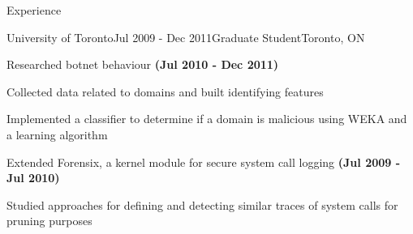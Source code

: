 \documentclass{resume}
\begin{document}
\begin{rSection}{Experience}
    \begin{rSubsection}{University of Toronto}{Jul 2009 - Dec 2011}{Graduate Student}{Toronto, ON}
      \item Researched botnet behaviour \textbf{(Jul 2010 - Dec 2011)}
      \item Collected data related to domains and built identifying features
      \item Implemented a classifier to determine if a domain is malicious using WEKA and a learning algorithm
      \vspace{1ex}
      \item Extended Forensix, a kernel module for secure system call logging \textbf{(Jul 2009 - Jul 2010)}
      \item Studied approaches for defining and detecting similar traces of system calls for pruning purposes
    \end{rSubsection}

\end{rSection}
\end{document}
